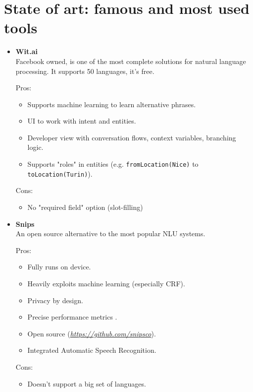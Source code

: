 \documentclass[a4paper,12pt]{report}
\begin{document}
	\section{State of art: famous and most used tools}
	\begin{itemize}
		\item \textbf{Wit.ai}\cite{witai}\\
		Facebook owned, is one of the most complete solutions for natural language processing. It supports 50 languages, it’s free.
		
		Pros:
		\begin{itemize}
			\item Supports machine learning to learn alternative phrases.
			\item UI to work with intent and entities.
			\item Developer view with conversation flows, context variables, branching logic.
			\item Supports "roles" in entities (e.g. \texttt{fromLocation(Nice)} to \texttt{toLocation(Turin)}).
		\end{itemize}
		
		Cons:
		\begin{itemize}
			\item No "required field" option (slot-filling)
		\end{itemize}	

		\item \textbf{Snips}\cite{snips}\\
		An open source alternative to the most popular NLU systems.
		
		Pros:
		\begin{itemize}
			\item Fully runs on device.
			\item Heavily exploits machine learning (especially CRF).
			\item Privacy by design.
			\item Precise performance metrics .
			\item Open source (\textit{\href{https://github.com/snipsco}{https://github.com/snipsco}}).
			\item Integrated Automatic Speech Recognition.
		\end{itemize}
		
		Cons:
		\begin{itemize}
			\item Doesn't support a big set of languages.
		\end{itemize}
	

\end{itemize}
\end{document}
